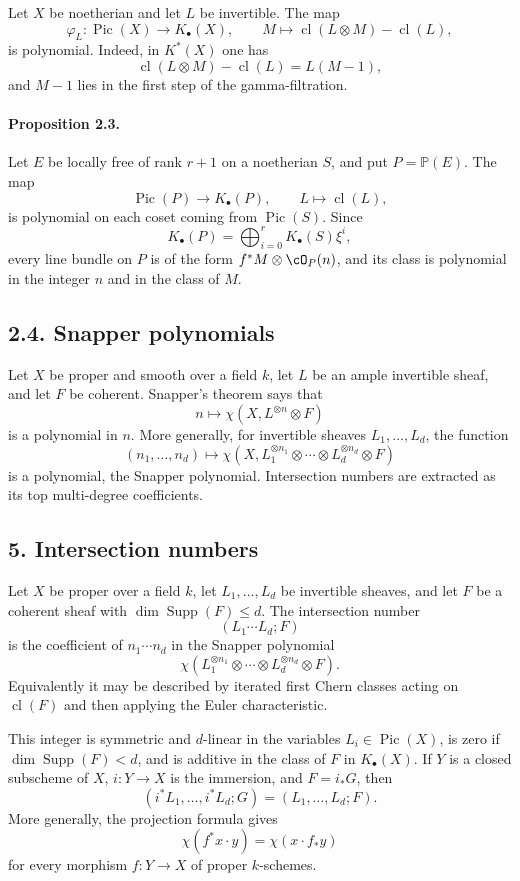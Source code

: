 \documentclass[11pt]{article}
\theoremstyle{plain}
\theoremstyle{definition}
\theoremstyle{remark}
\newcommand{\bP}{\mathbb P}
\DeclareMathOperator{\Pic}{Pic}
\DeclareMathOperator{\Supp}{Supp}
\DeclareMathOperator{\cl}{cl}
\newcommand{\longto}{\longrightarrow}
\begin{document}
Let $X$ be noetherian and let $L$ be invertible. The map
\[
\varphi_L:\Pic(X)\longto K_\bullet(X),\qquad
M\longmapsto \cl(L\otimes M)-\cl(L),
\]
is polynomial. Indeed, in $K^*(X)$ one has
\[
\cl(L\otimes M)-\cl(L)=L(M-1),
\]
and $M-1$ lies in the first step of the gamma-filtration.

\paragraph{Proposition 2.3.}
Let $E$ be locally free of rank $r+1$ on a noetherian $S$, and put $P=\bP(E)$. The map
\[
\Pic(P)\longto K_\bullet(P),\qquad L\longmapsto \cl(L),
\]
is polynomial on each coset coming from $\Pic(S)$. Since
\[
K_\bullet(P)=\bigoplus_{i=0}^r K_\bullet(S)\xi^i,
\]
every line bundle on $P$ is of the form $f^*M\otimes\cO_P(n)$, and its class is polynomial in the integer $n$ and in the class of $M$.

\subsection*{2.4. Snapper polynomials}

Let $X$ be proper and smooth over a field $k$, let $L$ be an ample invertible sheaf, and let $F$ be coherent. Snapper's theorem says that
\[
n\longmapsto \chi(X,L^{\otimes n}\otimes F)
\]
is a polynomial in $n$. More generally, for invertible sheaves $L_1,\ldots,L_d$, the function
\[
(n_1,\ldots,n_d)\longmapsto
\chi(X,L_1^{\otimes n_1}\otimes\cdots\otimes L_d^{\otimes n_d}\otimes F)
\]
is a polynomial, the Snapper polynomial. Intersection numbers are extracted as its top multi-degree coefficients.

\subsection*{5. Intersection numbers}

Let $X$ be proper over a field $k$, let $L_1,\ldots,L_d$ be invertible sheaves, and let $F$ be a coherent sheaf with $\dim\Supp(F)\leq d$. The intersection number
\[
(L_1\cdots L_d;F)
\]
is the coefficient of $n_1\cdots n_d$ in the Snapper polynomial
\[
\chi(L_1^{\otimes n_1}\otimes\cdots\otimes L_d^{\otimes n_d}\otimes F).
\]
Equivalently it may be described by iterated first Chern classes acting on $\cl(F)$ and then applying the Euler characteristic.

This integer is symmetric and $d$-linear in the variables $L_i\in\Pic(X)$, is zero if $\dim\Supp(F)<d$, and is additive in the class of $F$ in $K_\bullet(X)$. If $Y$ is a closed subscheme of $X$, $i:Y\to X$ is the immersion, and $F=i_*G$, then
\[
(i^*L_1,\ldots,i^*L_d;G)=(L_1,\ldots,L_d;F).
\]
More generally, the projection formula gives
\[
\chi(f^*x\cdot y)=\chi(x\cdot f_*y)
\]
for every morphism $f:Y\to X$ of proper $k$-schemes.
\end{document}
